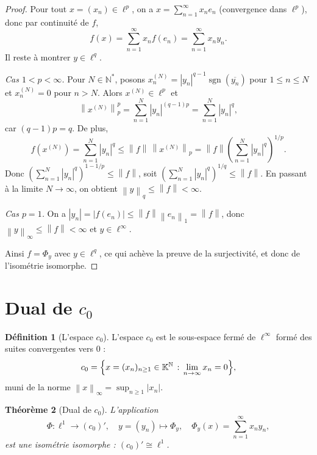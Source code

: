 \documentclass[a4paper,12pt]{book}
\DeclareMathOperator{\sgn}{sgn}
\newcommand{\N}{\mathbb{N}}
\newcommand{\K}{\mathbb{K}}
\newcommand{\norm}[1]{\left\| #1 \right\|}
\newcommand{\abs}[1]{\left| #1 \right|}
\theoremstyle{definition}
\newtheorem{definition}{Définition}[chapter]
\theoremstyle{plain}
\newtheorem{theoreme}[definition]{Théorème}
\theoremstyle{remark}
\begin{document}
\begin{proof}
Pour tout $x = (x_n) \in \ell^p$, on a $x = \sum_{n=1}^{\infty} x_n e_n$ (convergence
dans $\ell^p$), donc par continuité de $f$,
\[
  f(x) = \sum_{n=1}^{\infty} x_n f(e_n) = \sum_{n=1}^{\infty} x_n y_n.
\]
Il reste à montrer $y \in \ell^q$.

\emph{Cas $1 < p < \infty$.} Pour $N \in \N^*$, posons
$x_n^{(N)} = \abs{y_n}^{q-1} \sgn(\overline{y_n})$ pour $1 \le n \le N$ et
$x_n^{(N)} = 0$ pour $n > N$. Alors $x^{(N)} \in \ell^p$ et
\[
  \norm{x^{(N)}}_p^p = \sum_{n=1}^N \abs{y_n}^{(q-1)p} = \sum_{n=1}^N \abs{y_n}^q,
\]
car $(q-1)p = q$. De plus,
\[
  f(x^{(N)}) = \sum_{n=1}^N \abs{y_n}^q \le \norm{f} \, \norm{x^{(N)}}_p
  = \norm{f} \left( \sum_{n=1}^N \abs{y_n}^q \right)^{1/p}.
\]
Donc $\left(\sum_{n=1}^N \abs{y_n}^q\right)^{1 - 1/p} \le \norm{f}$,
soit $\left(\sum_{n=1}^N \abs{y_n}^q\right)^{1/q} \le \norm{f}$.
En passant à la limite $N \to \infty$, on obtient $\norm{y}_q \le \norm{f} < \infty$.

\emph{Cas $p = 1$.} On a $\abs{y_n} = \abs{f(e_n)} \le \norm{f} \norm{e_n}_1 = \norm{f}$,
donc $\norm{y}_\infty \le \norm{f} < \infty$ et $y \in \ell^\infty$.

Ainsi $f = \Phi_y$ avec $y \in \ell^q$, ce qui achève la preuve de la surjectivité,
et donc de l'isométrie isomorphe.
\end{proof}


\section{Dual de $c_0$}
\label{sec:dual-c0}


\begin{definition}[L'espace $c_0$]
\label{def:c0}
L'espace $c_0$ est le sous-espace fermé de $\ell^\infty$ formé des suites
convergentes vers $0$ :
\[
  c_0 = \Bigl\{ x = (x_n)_{n \ge 1} \in \K^\N \,:\, \lim_{n \to \infty} x_n = 0 \Bigr\},
\]
muni de la norme $\norm{x}_\infty = \sup_{n \ge 1} \abs{x_n}$.
\end{definition}

\begin{theoreme}[{Dual de $c_0$}]
\label{thm:dual-c0}
L'application
\[
  \Phi : \ell^1 \longrightarrow (c_0)', \quad
  y = (y_n) \longmapsto \Phi_y, \quad
  \Phi_y(x) = \sum_{n=1}^{\infty} x_n y_n,
\]
est une isométrie isomorphe : $(c_0)' \cong \ell^1$.
\end{theoreme}
\end{document}
